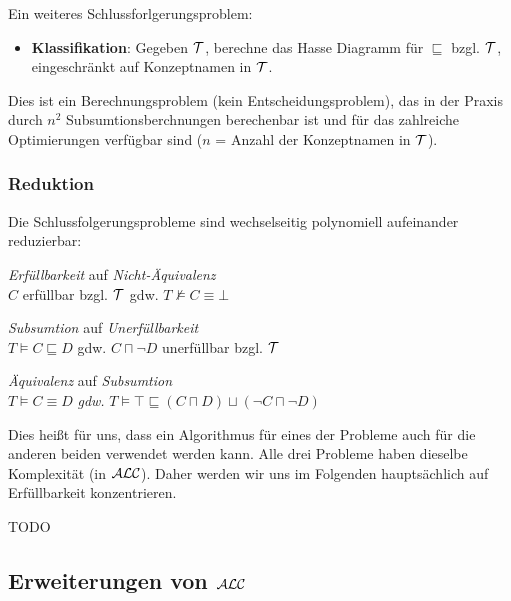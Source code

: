 Ein weiteres Schlussforlgerungsproblem:

\begin{itemize}
  \item \textbf{Klassifikation}: Gegeben $\mathcal{T}$, berechne das Hasse Diagramm für $\sqsubseteq$ bzgl. $\mathcal{T}$, eingeschränkt auf Konzeptnamen in $\mathcal{T}$.
\end{itemize}

Dies ist ein Berechnungsproblem (kein Entscheidungsproblem), das in der Praxis durch $n^2$ Subsumtionsberchnungen berechenbar ist und für das zahlreiche Optimierungen verfügbar sind ($n$ = Anzahl der Konzeptnamen in $\mathcal{T}$).

\subsubsection{Reduktion}

Die Schlussfolgerungsprobleme sind wechselseitig polynomiell aufeinander reduzierbar:

\begin{lemma}\mbox{}
\begin{enumerate}
\item{\emph{Erfüllbarkeit} auf \emph{Nicht-Äquivalenz} \\
$C$ erfüllbar bzgl. $\mathcal{T}$ gdw. $T \not\models C \equiv \bot$}
\item{\emph{Subsumtion} auf \emph{Unerfüllbarkeit} \\
$T \models C \sqsubseteq D$ gdw. $C \sqcap \neg D$ unerfüllbar bzgl.
$\mathcal{T}$
\item{\emph{Äquivalenz} auf \emph{Subsumtion} \\}
$T \models C \equiv D$ \emph{gdw.} $T \models \top \sqsubseteq \left( C \sqcap D \right) \sqcup \left( \neg C \sqcap \neg D \right)$}
\end{enumerate}
\end{lemma}

Dies heißt für uns, dass ein Algorithmus für eines der Probleme auch für die
anderen beiden verwendet werden kann. Alle drei Probleme haben dieselbe
Komplexität (in $\mathcal{A}\mathcal{L}\mathcal{C}$). Daher werden wir uns im Folgenden hauptsächlich auf
Erfüllbarkeit konzentrieren.

\begin{tafel}
    TODO
\end{tafel}

\subsection{Erweiterungen von \texorpdfstring{$\mathcal{A}\mathcal{L}\mathcal{C}$}{ALC}}\label{erweiterungen-von-alc}

